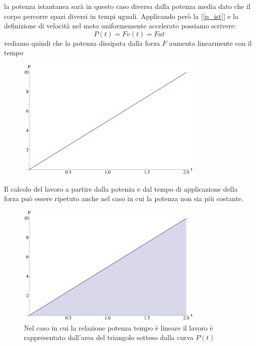 \documentclass[a4paper,10pt,oneside]{article}
\begin{document}
la potenza istantanea sarà in questo caso diversa dalla potenza media dato che il corpo percorre spazi diversi in tempi uguali. Applicando però la [\ref{p_ist}] e la definizione di velocità nel moto uniformemente accelerato possiamo scrivere:
\begin{equation}
 P(t)=Fv(t)=Fat
\end{equation}
vediamo quindi che la potenza dissipata dalla forza $F$ aumenta linearmente con il tempo
\begin{figure}[H]
 \centering
 \includegraphics[width=0.8\textwidth]{./immagini/potenza_lineare.pdf}
 \label{fig:potenza_lineare}
\end{figure}
Il calcolo del lavoro a partire dalla potenza e dal tempo di applicazione della forza può essere ripetuto anche nel caso in cui la potenza non sia più costante.

\begin{figure}[H]
 \centering
 \includegraphics[width=0.8\textwidth]{./immagini/potenza_lavoro2.pdf}
 \caption{Nel caso in cui la relazione potenza tempo è lineare il lavoro è rappresentato dall'area del triangolo sotteso dalla curva $P(t)$}
 \label{fig:pot_lav2}
\end{figure}
\end{document}

